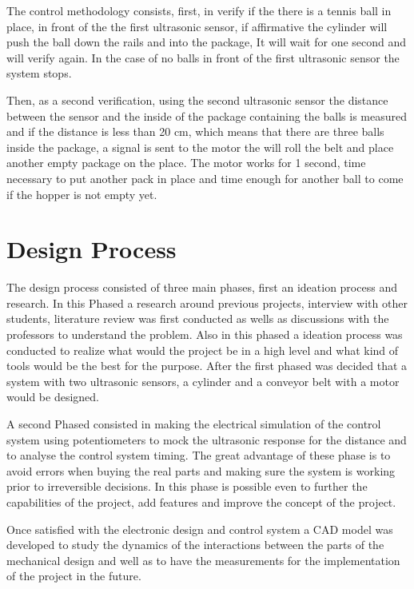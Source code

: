 \documentclass[transmag]{IEEEtran}
\begin{document}
The control methodology consists, first, in verify if the there is a tennis ball in place, in front of the the first ultrasonic sensor, if affirmative the cylinder will push the ball down the rails and into the package, It will wait for one second and will verify again. In the case of no balls in front of the first ultrasonic sensor the system stops.

Then, as a second verification, using the second ultrasonic sensor the distance between the sensor and the inside of the package containing the balls is measured and if the distance is less than 20 cm, which means that there are three balls inside the package, a signal is sent to the motor the will roll the belt and place another empty package on the place. The motor works for 1 second, time necessary to put another pack in place and time enough for another ball to come if the hopper is not empty yet.


 
\section{Design Process}


The design process consisted of three main phases, first an ideation process and research. In this Phased a research around previous projects, interview with other students, literature review was first conducted as wells as discussions with the professors to understand the problem. Also in this phased a ideation process was conducted to realize what would the project be in a high level and what kind of tools would be the best for the purpose.
After the first phased was decided that a system with two ultrasonic sensors, a cylinder and a conveyor belt with a motor would be designed.

A second Phased consisted in making the electrical simulation of the control system using potentiometers to mock the ultrasonic response for the distance and to analyse the control system timing. The great advantage of these phase is to avoid errors when buying the real parts and making sure the system is working prior to irreversible decisions. In this phase is possible even to further the capabilities of the project, add features and improve the concept of the project. 


Once satisfied with the electronic design and control system a CAD model was developed to study the dynamics of the interactions between the parts of the mechanical design and well as to have the measurements for the implementation of the project in the future.
\end{document}
